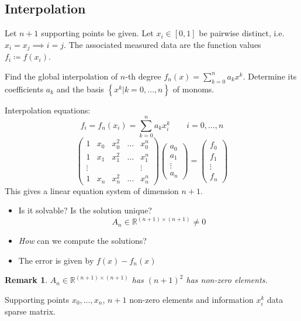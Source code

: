 \documentclass{article}
\newtheorem*{remark}{Remark}
\newcommand{\setdef}[2]{\left\{#1|#2\right\}}
\begin{document}
\subsection{Interpolation}

Let $n+1$ supporting points be given. Let $x_i \in [0,1]$ be pairwise distinct, i.e. $x_i = x_j \implies i = j$.
The associated measured data are the function values $f_i \coloneqq f(x_i)$.

Find the global interpolation of $n$-th degree $f_n(x) = \sum_{k=0}^n a_k x^k$. Determine its coefficients $a_k$ and the basis $\setdef{x^k}{k = 0,\dots,n}$ of monoms.

Interpolation equations:
\[ f_i = f_n(x_i) = \sum_{k=0}^n a_k x_i^k \qquad i = 0,\dots,n \]
\[
  \begin{pmatrix}
    1 & x_0 & x_0^2 & \dots & x_0^n \\
    1 & x_1 & x_1^2 & \dots & x_1^n \\
    \vdots &  & & & \vdots \\
    1 & x_n & x_n^2 & \dots & x_n^n
  \end{pmatrix}
  \begin{pmatrix} a_0 \\ a_1 \\ \vdots \\ a_n \end{pmatrix}
  =
  \begin{pmatrix} f_0 \\ f_1 \\ \vdots \\ f_n \end{pmatrix}
\]
This gives a linear equation system of dimension $n+1$.

\begin{itemize}
  \item Is it solvable? Is the solution unique?
    \[ A_n \in \mathbb R^{(n+1) \times (n+1)} \neq 0 \]
  \item \emph{How} can we compute the solutions?
  \item The error is given by $f(x) - f_n(x)$
\end{itemize}

\begin{remark}
  $A_n \in \mathbb R^{(n+1)\times(n+1)}$ has $(n+1)^2$ has non-zero elements.
\end{remark}

Supporting points $x_0, \dots, x_n$, $n+1$ non-zero elements and information $x_i^k$ data sparse matrix.
\end{document}
